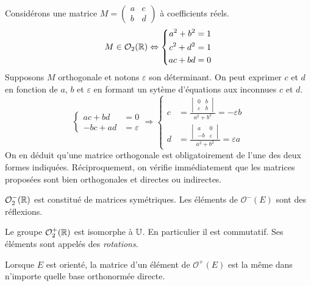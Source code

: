 \begin{demo}
 Considérons une matrice $M= \begin{pmatrix} a & c \\ b & d\end{pmatrix}$ à coefficients réels. 
 \[
  M \in \mathcal O_2(\mathbb{R}) \Leftrightarrow 
  \left\lbrace 
  \begin{aligned}
   a^2 + b^2 &= 1\\
   c^2 + d^2 &= 1\\
   ac + bd &= 0
  \end{aligned}
\right. 
 \]
Supposons $M$ orthogonale et notons $\varepsilon$ son déterminant. On peut exprimer $c$ et $d$ en fonction de $a$, $b$ et $\varepsilon$ en formant un sytème d'équations aux inconnues $c$ et $d$.
\[
 \left\lbrace 
 \begin{aligned}
  ac + bd &= 0 \\ -bc + ad &= \varepsilon 
 \end{aligned}
\right. \Rightarrow 
\left\lbrace 
\begin{aligned}
 c &= \frac{\begin{vmatrix}
             0 & b \\ \varepsilon & b 
            \end{vmatrix}
}{a^2 + b^2}
= -\varepsilon b\\
 d &= \frac{\begin{vmatrix}
             a & 0 \\ -b & \varepsilon  
            \end{vmatrix}
}{a^2 + b^2}
= \varepsilon a
\end{aligned}
\right. 
\]
On en déduit qu'une matrice orthogonale est obligatoirement de l'une des deux formes indiquées. Réciproquement, on vérifie immédiatement que les matrices proposées sont bien orthogonales et directes ou indirectes.
\end{demo}

\begin{rem}
 $\mathcal O_2^-(\mathbb{R})$ est constitué de matrices symétriques. Les éléments de $\mathcal O^-(E)$ sont des réflexions.
\end{rem}

Le groupe $\mathcal O_2^+(\mathbb{R})$ est isomorphe à $\mathbb{U}$. En particulier il est commutatif. Ses éléments sont appelés des \emph{rotations}.

Lorsque $E$ est orienté, la matrice d'un élément de $\mathcal O^+(E)$ est la même dans n'importe quelle base orthonormée directe.

